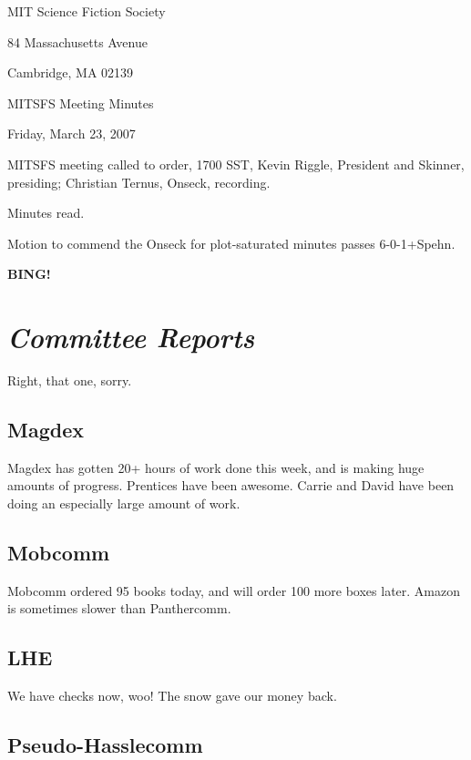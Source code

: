 \documentclass[10pt]{article}
\newcommand{\bing}{{\bf BING!} }
\newcommand{\goto}[1]{\bing \vskip 12pt \section*{{\em{#1}}}}
\begin{document}
\begin{center}

MIT Science Fiction Society

84 Massachusetts Avenue

Cambridge, MA 02139

\vspace{12pt}

MITSFS Meeting Minutes

Friday, March 23, 2007

\end{center}

\vspace{18pt}

\setlength{\parskip}{6pt}

\noindent
MITSFS meeting called to order, 1700 SST,
Kevin Riggle, President and Skinner, presiding; Christian Ternus, Onseck, recording.

Minutes read.

Motion to commend the Onseck for plot-saturated minutes passes 6-0-1+Spehn.

\goto{Committee Reports}

Right, that one, sorry.

\subsection*{Magdex}

Magdex has gotten 20+ hours of work done this week, and is making huge amounts of
progress.  Prentices have been awesome.  Carrie and David have been doing an especially
large amount of work.

\subsection*{Mobcomm}

Mobcomm ordered 95 books today, and will order 100 more boxes later.  Amazon is sometimes slower
than Panthercomm.

\subsection*{LHE}

We have checks now, woo!  The snow gave our money back.

\subsection*{Pseudo-Hasslecomm}
\end{document}
